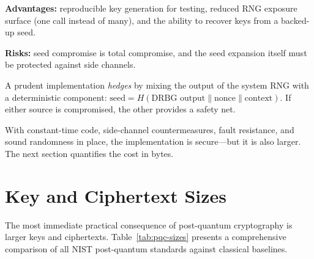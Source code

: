 \textbf{Advantages:} reproducible key generation for testing, reduced RNG exposure surface (one call instead of many), and the ability to recover keys from a backed-up seed.

\textbf{Risks:} seed compromise is total compromise, and the seed expansion itself must be protected against side channels.

\begin{remark}
A prudent implementation \emph{hedges} by mixing the output of the system RNG with a deterministic component: $\text{seed} = H(\text{DRBG output} \| \text{nonce} \| \text{context})$.  If either source is compromised, the other provides a safety net.
\end{remark}

With constant-time code, side-channel countermeasures, fault resistance, and sound randomness in place, the implementation is secure---but it is also larger.  The next section quantifies the cost in bytes.


\section{Key and Ciphertext Sizes}
\label{sec:sizes}

The most immediate practical consequence of post-quantum cryptography is larger keys and ciphertexts.  Table~\ref{tab:pqc-sizes} presents a comprehensive comparison of all NIST post-quantum standards against classical baselines.

